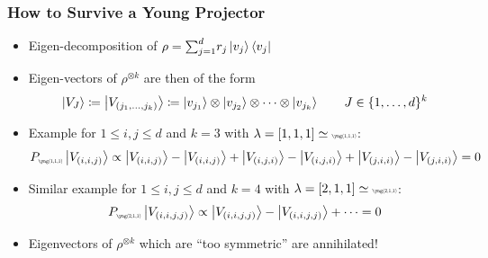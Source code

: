 \documentclass[
    9pt,
    hyperref={bookmarks=false, colorlinks=false}, %
    xcolor={dvipsnames},
]{beamer}
\begin{document}
\begin{frame}
    \frametitle{How to Survive a Young Projector}
    \begin{itemize}
        \item Eigen-decomposition of $\rho = {\sum}_{j=1}^{d} r_j \ket{v_j} \bra{v_j}$
        \item Eigen-vectors of $\rho^{\otimes k}$ are then of the form
            \[ \ket{V_{J}} \coloneqq \ket{V_{(j_1, \ldots, j_k)}} \coloneqq \ket{v_{j_1}}\otimes\ket{v_{j_2}}\otimes \cdots \otimes\ket{v_{j_k}}\qquad J \in \{ 1, \ldots, d\}^{k} \]
        \item Example for $1 \leq i, j \leq d$ and $k=3$ with $\lambda = [1,1,1] \simeq \scalebox{0.4}{\yng(1,1,1)}$:
            \[ P_{\scalebox{0.4}{\yng(1,1,1)}} \ket{V_{(i, i, j)}} \propto \ket{V_{(i, i, j)}} - \ket{V_{(i, i, j)}} + \ket{V_{(i, j, i)}} - \ket{V_{(i, j, i)}}+\ket{V_{(j, i, i)}} - \ket{V_{(j, i, i)}} = 0\]
        \item Similar example for $1 \leq i, j \leq d$ and $k=4$ with $\lambda = [2,1,1] \simeq \scalebox{0.4}{\yng(2,1,1)}$:
            \[ P_{\scalebox{0.4}{\yng(2,1,1)}} \ket{V_{(i, i, j, j)}} \propto \ket{V_{(i, i, j, j)}} - \ket{V_{(i, i, j, j)}} + \cdots = 0\]
        \item Eigenvectors of $\rho^{\otimes k}$ which are ``too symmetric'' are annihilated!
    \end{itemize}
\end{frame}
\end{document}
